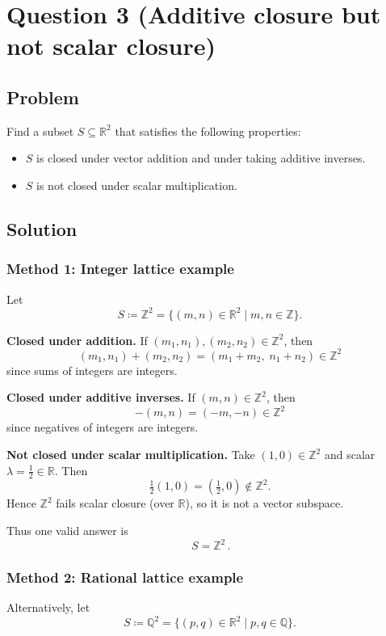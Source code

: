 \documentclass[12pt]{article}
\begin{document}
\section{Question 3 (Additive closure but not scalar closure)}
\subsection{Problem}
Find a subset \(S\subseteq \mathbb{R}^2\) that satisfies the following properties:
\begin{itemize}[leftmargin=*]
  \item \(S\) is closed under vector addition and under taking additive inverses.
  \item \(S\) is not closed under scalar multiplication.
\end{itemize}

\subsection{Solution}

\subsubsection{Method 1: Integer lattice example}
Let
\[
S\coloneqq \mathbb{Z}^2=\{(m,n)\in \mathbb{R}^2\mid m,n\in\mathbb{Z}\}.
\]

\textbf{Closed under addition.} If \((m_1,n_1),(m_2,n_2)\in \mathbb{Z}^2\), then
\[
(m_1,n_1)+(m_2,n_2)=(m_1+m_2,\;n_1+n_2)\in\mathbb{Z}^2
\]
since sums of integers are integers.

\textbf{Closed under additive inverses.} If \((m,n)\in\mathbb{Z}^2\), then
\[
-(m,n)=(-m,-n)\in\mathbb{Z}^2
\]
since negatives of integers are integers.

\textbf{Not closed under scalar multiplication.} Take \((1,0)\in\mathbb{Z}^2\) and scalar \(\lambda=\tfrac12\in\mathbb{R}\). Then
\[
\tfrac12(1,0)=\left(\tfrac12,0\right)\notin \mathbb{Z}^2.
\]
Hence \(\mathbb{Z}^2\) fails scalar closure (over \(\mathbb{R}\)), so it is not a vector subspace.

Thus one valid answer is
\[
\boxed{\,S=\mathbb{Z}^2\, }.
\]

\subsubsection{Method 2: Rational lattice example}
Alternatively, let
\[
S\coloneqq \mathbb{Q}^2=\{(p,q)\in \mathbb{R}^2\mid p,q\in\mathbb{Q}\}.
\]
\end{document}
